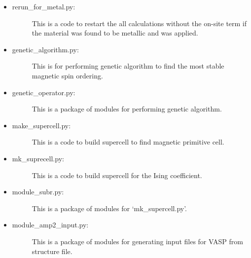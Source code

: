 \documentclass[letterpaper,10pt,english]{sphinxmanual}
\begin{document}
\begin{itemize}
\item {} \begin{description}
\item[{rerun\_for\_metal.py:}] \leavevmode
This is a code to restart the all calculations without the on-site 
term if the material was found to be metallic and  was applied.

\end{description}

\item {} \begin{description}
\item[{genetic\_algorithm.py:}] \leavevmode
This is for performing genetic algorithm to find the most stable magnetic
spin ordering.

\end{description}

\item {} \begin{description}
\item[{genetic\_operator.py:}] \leavevmode
This is a package of modules for performing genetic algorithm.

\end{description}

\item {} \begin{description}
\item[{make\_supercell.py:}] \leavevmode
This is a code to build supercell to find magnetic primitive cell.

\end{description}

\item {} \begin{description}
\item[{mk\_suprecell.py:}] \leavevmode
This is a code to build supercell for the Ising coefficient.

\end{description}

\item {} \begin{description}
\item[{module\_subr.py:}] \leavevmode
This is a package of modules for ‘mk\_supercell.py’.

\end{description}

\item {} \begin{description}
\item[{module\_amp2\_input.py:}] \leavevmode
This is a package of modules for generating input files for VASP from structure file.


\end{description}
\end{itemize}
\end{document}
